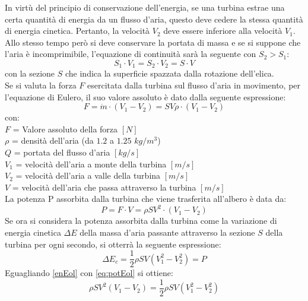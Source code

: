 In virtù del principio di conservazione dell'energia, se una turbina estrae una certa quantità di energia da un flusso d'aria, questo deve cedere la stessa quantità di energia cinetica. Pertanto, la velocità $V_2$ deve essere inferiore alla velocità $V_1$. Allo stesso tempo però si deve conservare la portata di massa e se si suppone che l'aria è incomprimibile, l'equazione di continuità sarà la seguente con $S_2>S_1$:
\begin{equation}
S_1 \cdot V_1 = S_2 \cdot V_2 = S \cdot V
\end{equation}
con la sezione $S$ che indica la superficie spazzata dalla rotazione dell'elica.\\
Se si valuta la forza $F$ esercitata dalla turbina sul flusso d'aria in movimento, per l'equazione di Eulero, il suo valore assoluto è dato dalla seguente espressione:
\begin{equation}
F = \dot{m} \cdot \left( V_1 - V_2 \right) = S V \rho \cdot \left( V_1 - V_2 \right)
\end{equation}
con:\\[1mm]
$F$ = Valore assoluto della forza $[N]$\\
$\rho$ = densità dell'aria (da $1.2$ a $1.25$ $kg/m^3$)\\
$Q$ = portata del flusso d'aria $[kg/s]$\\
$V_1$ = velocità dell'aria a monte della turbina $[m/s]$\\
$V_2$ = velocità dell'aria a valle della turbina $[m/s]$\\
$V$ = velocità dell'aria che passa attraverso la turbina $[m/s]$\\[2mm]
La potenza P assorbita dalla turbina che viene trasferita all'albero è data da:
\begin{equation}\label{eq:potEol}
P = F \cdot V = \rho S V^2 \cdot \left( V_1 - V_2 \right)
\end{equation}
Se ora si considera la potenza assorbita dalla turbina come la variazione di energia cinetica $\Delta E$ della massa d'aria passante attraverso la sezione $S$ della turbina per ogni secondo, si otterrà la seguente espressione:
\begin{equation}\label{enEol}
\Delta E_c = \frac{1}{2} \rho	S V \left(V_1^2 - V_2^2 \right) = P
\end{equation}
Eguagliando \ref{enEol} con \ref{eq:potEol} si ottiene:
\begin{equation}
\rho S V^2 \left(V_1 - V_2 \right) = \frac{1}{2} \rho S V \left(V_1^2-V_2^2 \right)
\label{eq:P_a2}
\end{equation}
